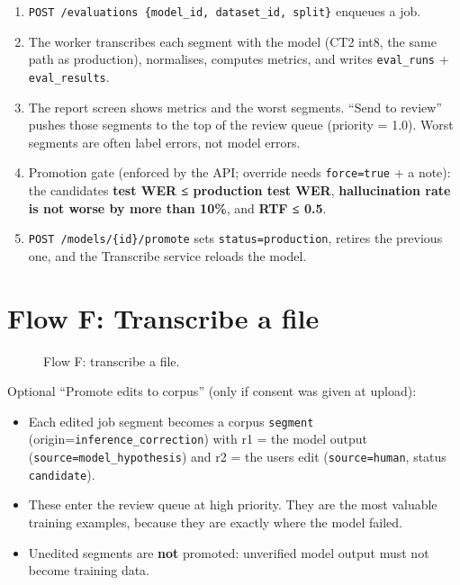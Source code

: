 \documentclass[11pt]{article}
\begin{document}
\begin{enumerate}
\def\labelenumi{\arabic{enumi}.}
\tightlist
\item
  \texttt{POST /\allowbreak{}evaluations \{model\_\allowbreak{}id,\allowbreak{} dataset\_\allowbreak{}id,\allowbreak{} split\}} enqueues a job.
\item
  The worker transcribes each segment with the model (CT2 int8, the same path as production), normalises, computes metrics, and writes \texttt{eval\_\allowbreak{}runs} + \texttt{eval\_\allowbreak{}results}.
\item
  The report screen shows metrics and the worst segments. ``Send to review'' pushes those segments to the top of the review queue (priority = 1.0). Worst segments are often label errors, not model errors.
\item
  Promotion gate (enforced by the API; override needs \texttt{force=\allowbreak{}true} + a note): the candidate\textquotesingle s \textbf{test WER ≤ production test WER}, \textbf{hallucination rate is not worse by more than 10\%}, and \textbf{RTF ≤ 0.5}.
\item
  \texttt{POST /\allowbreak{}models/\allowbreak{}\{id\}/\allowbreak{}promote} sets \texttt{status=\allowbreak{}production}, retires the previous one, and the Transcribe service reloads the model.
\end{enumerate}

\hypertarget{flow-f-transcribe-a-file}{%
\section{Flow F: Transcribe a file}\label{flow-f-transcribe-a-file}}

\begin{figure}[!htbp]\centering
\resizebox{\ifdim\width>\linewidth\linewidth\else\width\fi}{!}{}
\caption{Flow F: transcribe a file.}
\end{figure}

Optional ``Promote edits to corpus'' (only if consent was given at upload):

\begin{itemize}
\tightlist
\item
  Each edited job segment becomes a corpus \texttt{segment} (origin=\texttt{inference\_\allowbreak{}correction}) with r1 = the model output (\texttt{source=\allowbreak{}model\_\allowbreak{}hypothesis}) and r2 = the user\textquotesingle s edit (\texttt{source=\allowbreak{}human}, status \texttt{candidate}).
\item
  These enter the review queue at high priority. They are the most valuable training examples, because they are exactly where the model failed.
\item
  Unedited segments are \textbf{not} promoted: unverified model output must not become training data.
\end{itemize}
\end{document}
